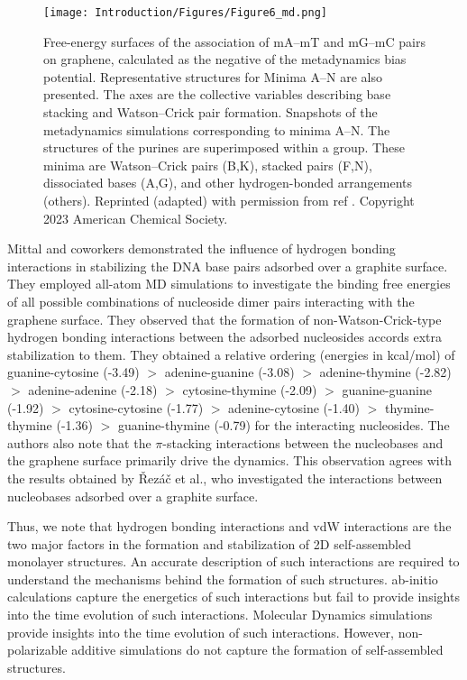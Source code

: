 \begin{figure}
    \centering
    \texttt{[image: Introduction/Figures/Figure6\_md.png]}
    \caption[Free-energy surfaces of the association of mA–mT and mG–mC pairs on graphene. Representative structures for minima are also presented]{Free-energy surfaces of the association of mA–mT and mG–mC pairs on graphene, calculated as the negative of the metadynamics bias potential. Representative structures for Minima A–N are also presented. The axes are the collective variables describing base stacking and Watson–Crick pair formation. Snapshots of the metadynamics simulations corresponding to minima A–N. The structures of the purines are superimposed within a group. These minima are Watson–Crick pairs (B,K), stacked pairs (F,N), dissociated bases (A,G), and other hydrogen-bonded arrangements (others). Reprinted (adapted) with permission from ref \supercite{spiwok_free-energy_2011}. Copyright 2023 American Chemical Society.}
    \label{fig:figure12}
\end{figure}

Mittal and coworkers demonstrated the influence of hydrogen bonding interactions in stabilizing the DNA base pairs adsorbed over a graphite surface.\supercite{shankar_dna_2012} They employed all-atom MD simulations to investigate the binding free energies of all possible combinations of nucleoside dimer pairs interacting with the graphene surface. They observed that the formation of non-Watson-Crick-type hydrogen bonding interactions between the adsorbed nucleosides accords extra stabilization to them. They obtained a relative ordering (energies in kcal/mol) of guanine-cytosine (-3.49) $>$ adenine-guanine (-3.08) $>$ adenine-thymine (-2.82) $>$ adenine-adenine (-2.18) $>$ cytosine-thymine (-2.09) $>$ guanine-guanine (-1.92) $>$ cytosine-cytosine (-1.77) $>$ adenine-cytosine (-1.40) $>$ thymine-thymine (-1.36) $>$ guanine-thymine (-0.79) for the interacting nucleosides. The authors also note that the $\pi$-stacking interactions between the nucleobases and the graphene surface primarily drive the dynamics. This observation agrees with the results obtained by Řezáč et al.,\supercite{spiwok_free-energy_2011} who investigated the interactions between nucleobases adsorbed over a graphite surface.

Thus, we note that hydrogen bonding interactions and vdW interactions are the two major factors in the formation and stabilization of 2D self-assembled monolayer structures. An accurate description of such interactions are required to understand the mechanisms behind the formation of such structures. ab-initio calculations capture the energetics of such interactions but fail to provide insights into the time evolution of such interactions. Molecular Dynamics simulations provide insights into the time evolution of such interactions. However, non-polarizable additive simulations do not capture the formation of self-assembled structures. 

